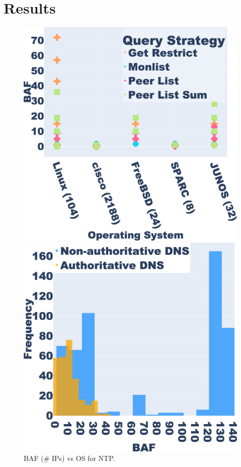 \section{Results}


\captionsetup{font=small}
\begin{figure}[t]
    \centering
    \begin{minipage}[b]{0.2385\textwidth}
        \centering
        \includegraphics[width=\textwidth]{research paper/plots/ntp_systems_processed_all_trim.png}
        \caption{BAF (\# IPs) vs OS for NTP.}
        \label{fig:ntp_os}
    \end{minipage}
    \hfill
    \begin{minipage}[b]{0.2385\textwidth}
        \centering
        \includegraphics[width=\textwidth]{research paper/plots/dns_sl_histogram_incl_auth3_trim.png}

\end{minipage}
\end{figure}
